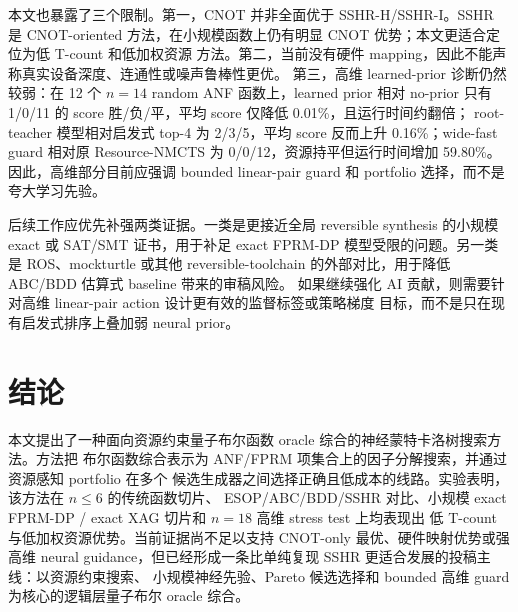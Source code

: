 \documentclass[UTF8,fontset=macnew,11pt]{ctexart}
\newcommand{\method}{Resource-NMCTS}
\begin{document}
本文也暴露了三个限制。第一，CNOT 并非全面优于 SSHR-H/SSHR-I。SSHR 是 CNOT-oriented
方法，在小规模函数上仍有明显 CNOT 优势；本文更适合定位为低 T-count 和低加权资源
方法。第二，当前没有硬件 mapping，因此不能声称真实设备深度、连通性或噪声鲁棒性更优。
第三，高维 learned-prior 诊断仍然较弱：在 12 个 $n=14$ random ANF 函数上，learned prior
相对 no-prior 只有 1/0/11 的 score 胜/负/平，平均 score 仅降低 0.01\%，且运行时间约翻倍；
root-teacher 模型相对启发式 top-4 为 2/3/5，平均 score 反而上升 0.16\%；wide-fast guard
相对原 \method{} 为 0/0/12，资源持平但运行时间增加 59.80\%。因此，高维部分目前应强调
bounded linear-pair guard 和 portfolio 选择，而不是夸大学习先验。

后续工作应优先补强两类证据。一类是更接近全局 reversible synthesis 的小规模 exact
或 SAT/SMT 证书，用于补足 exact FPRM-DP 模型受限的问题。另一类是 ROS、mockturtle
或其他 reversible-toolchain 的外部对比，用于降低 ABC/BDD 估算式 baseline 带来的审稿风险。
如果继续强化 AI 贡献，则需要针对高维 linear-pair action 设计更有效的监督标签或策略梯度
目标，而不是只在现有启发式排序上叠加弱 neural prior。

\section{结论}

本文提出了一种面向资源约束量子布尔函数 oracle 综合的神经蒙特卡洛树搜索方法。方法把
布尔函数综合表示为 ANF/FPRM 项集合上的因子分解搜索，并通过资源感知 portfolio 在多个
候选生成器之间选择正确且低成本的线路。实验表明，该方法在 $n\leq 6$ 的传统函数切片、
ESOP/ABC/BDD/SSHR 对比、小规模 exact FPRM-DP / exact XAG 切片和 $n=18$ 高维 stress test 上均表现出
低 T-count 与低加权资源优势。当前证据尚不足以支持 CNOT-only 最优、硬件映射优势或强高维
neural guidance，但已经形成一条比单纯复现 SSHR 更适合发展的投稿主线：以资源约束搜索、
小规模神经先验、Pareto 候选选择和 bounded 高维 guard 为核心的逻辑层量子布尔 oracle 综合。
\end{document}
